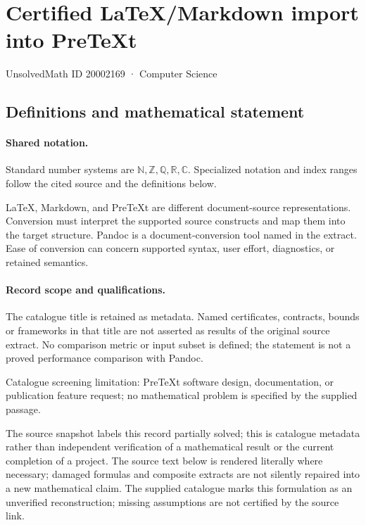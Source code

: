 \documentclass[11pt]{article}
\begin{document}
\setcounter{section}{20002168}
\section{Certified LaTeX/Markdown import into PreTeXt}\label{20002169}
{\small\sffamily UnsolvedMath ID 20002169 · Computer Science}
\subsection{Definitions and mathematical statement}

\paragraph{Shared notation.}Standard number systems are $\mathbb N,\mathbb Z,\mathbb Q,\mathbb R,\mathbb C$. Specialized notation and index ranges follow the cited source and the definitions below.


LaTeX, Markdown, and PreTeXt are different document-source representations. Conversion must interpret the supported source constructs and map them into the target structure. Pandoc is a document-conversion tool named in the extract. Ease of conversion can concern supported syntax, user effort, diagnostics, or retained semantics.
\paragraph{Record scope and qualifications.}
The catalogue title is retained as metadata. Named certificates, contracts, bounds or frameworks in that title are not asserted as results of the original source extract.
No comparison metric or input subset is defined; the statement is not a proved performance comparison with Pandoc.

Catalogue screening limitation: PreTeXt software design, documentation, or publication feature request; no mathematical problem is specified by the supplied passage.

The source snapshot labels this record partially solved; this is catalogue metadata rather than independent verification of a mathematical result or the current completion of a project.
The source text below is rendered literally where necessary; damaged formulas and composite extracts are not silently repaired into a new mathematical claim.
The supplied catalogue marks this formulation as an unverified reconstruction; missing assumptions are not certified by the source link.
\end{document}
